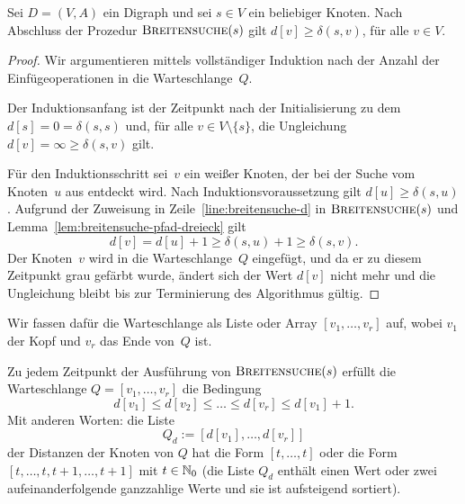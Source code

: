 \begin{lem}
\label{lem:breitensuche-d-geq-delta}
Sei $D=(V,A)$ ein Digraph und sei $s \in V$ ein beliebiger Knoten.
Nach Abschluss der Prozedur $\mathop{\text{\textsc{Breitensuche}}}(s)$ gilt $d[v] \geq \delta(s,v)$, für alle $v \in V$.
\end{lem}

\begin{proof}
Wir argumentieren mittels vollständiger Induktion nach der Anzahl der Ein\-füge\-operationen in die Warteschlange~$Q$.

Der Induktionsanfang ist der Zeitpunkt nach der Initialisierung zu dem $d[s]=0=\delta(s,s)$ und, für alle $v \in V \setminus \{s\}$, die Ungleichung $d[v]=\infty\geq\delta(s,v)$ gilt.

Für den Induktionsschritt sei~$v$ ein weißer Knoten, der bei der Suche vom Knoten~$u$ aus entdeckt wird.
Nach Induktionsvoraussetzung gilt $d[u] \geq \delta(s,u)$.
Aufgrund der Zuweisung in Zeile~\ref{line:breitensuche-d} in $\mathop{\text{\textsc{Breitensuche}}}(s)$ und Lemma~\ref{lem:breitensuche-pfad-dreieck} gilt
\[
d[v] = d[u] + 1 \geq \delta(s,u) + 1 \geq \delta(s,v).
\]
Der Knoten~$v$ wird in die Warteschlange~$Q$ eingefügt, und da er zu diesem Zeitpunkt grau gefärbt wurde, ändert sich der Wert $d[v]$ nicht mehr und die Ungleichung bleibt bis zur Terminierung des Algorithmus gültig.
\end{proof}

\begin{bem} 
Wir fassen dafür die Warteschlange als Liste oder Array $[v_1,\ldots,v_r]$ auf, wobei $v_1$ der Kopf und $v_r$ das Ende von~$Q$ ist.
\end{bem} 

\begin{lem}
\label{lem:breitensuche-warteschlange-monotonie}
Zu jedem Zeitpunkt der Ausführung von $\mathop{\text{\textsc{Breitensuche}}}(s)$ erfüllt die Warteschlange $Q=[v_1,\ldots,v_r]$ die Bedingung
\[
d[v_1] \leq d[v_2] \leq \ldots \leq d[v_r] \leq d[v_1] + 1.
\]
Mit anderen Worten: die Liste 
\[
	Q_d:=[d[v_1],\ldots,d[v_r]]
\] der Distanzen der Knoten von $Q$ hat die Form $[t,\ldots,t]$ oder die Form $[t,\ldots,t,t+1,\ldots,t+1]$ mit $t \in \mathbb{N}_0$ (die Liste $Q_d$ enthält einen Wert oder zwei aufeinanderfolgende ganzzahlige Werte und sie ist aufsteigend sortiert). 
\end{lem}

